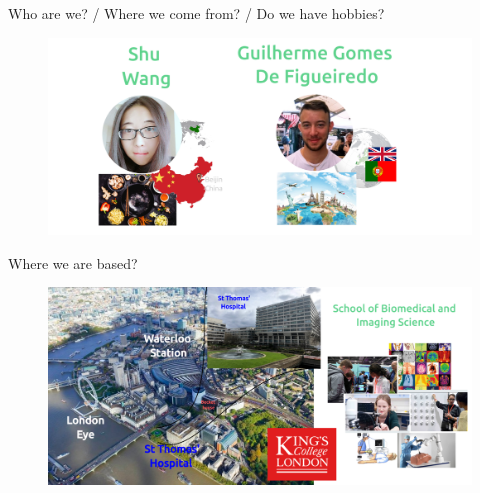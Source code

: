 
{
\begin{frame}{Who are we? / Where we come from? / Do we have hobbies?}

  \begin{figure}
  \centering
  \includegraphics[width=1.0\textwidth]{./../figures/team/who-we-are/versions/drawing-v10.png}
  \end{figure}

\end{frame}
}




{
\begin{frame}{Where we are based?}

  \begin{figure}
  \centering
  \includegraphics[width=1.0\textwidth]{./../figures/where-we-are-based/versions/drawing-v04.png}
  \end{figure}

\end{frame}
}





